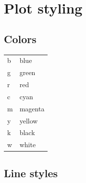 \documentclass{article}
\begin{document}







\appendix
\newpage

\section{Plot styling}

\begin{multicols}{2}

\subsection{Colors}

\begin{tabular}{ l l }
b & blue \\
g & green \\
r & red \\
c & cyan \\
m & magenta \\
y & yellow \\
k & black \\
w & white
\end{tabular}

\columnbreak

\subsection{Line styles}


\end{multicols}
\end{document}
